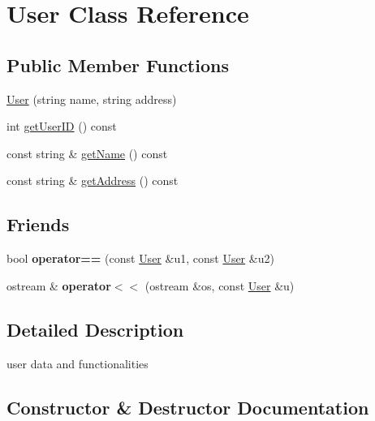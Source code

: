 \hypertarget{class_user}{}\section{User Class Reference}
\label{class_user}
\subsection*{Public Member Functions}
\begin{DoxyCompactItemize}
\item 
\hyperlink{class_user_a7d8f1de813351d98afcfe7f2daf41507}{User} (string name, string address)
\item 
int \hyperlink{class_user_ada4589ad6179f55dcb35ab5afdab78f5}{get\+User\+ID} () const 
\item 
const string \& \hyperlink{class_user_ad253dd3bf9b1effaab72e36e13e1d152}{get\+Name} () const 
\item 
const string \& \hyperlink{class_user_aa575209c344804d21452e6de006ef467}{get\+Address} () const 
\end{DoxyCompactItemize}
\subsection*{Friends}
\begin{DoxyCompactItemize}
\item 
bool {\bfseries operator==} (const \hyperlink{class_user}{User} \&u1, const \hyperlink{class_user}{User} \&u2)\hypertarget{class_user_af6f50d4046256c15aa6b2a061543bfbe}{}\label{class_user_af6f50d4046256c15aa6b2a061543bfbe}

\item 
ostream \& {\bfseries operator$<$$<$} (ostream \&os, const \hyperlink{class_user}{User} \&u)\hypertarget{class_user_a033c555cac168a4b631ea88982e171a8}{}\label{class_user_a033c555cac168a4b631ea88982e171a8}

\end{DoxyCompactItemize}


\subsection{Detailed Description}
user data and functionalities 

\subsection{Constructor \& Destructor Documentation}
